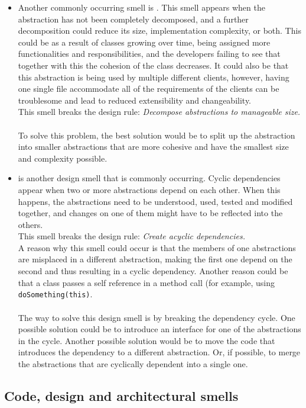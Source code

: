 \begin{itemize}
            \item Another commonly occurring smell is . This smell appears when the abstraction has not been completely decomposed, and a further decomposition could reduce its size, implementation complexity, or both. This could be as a result of classes growing over time, being assigned more functionalities and responsibilities, and the developers failing to see that together with this the cohesion of the class decreases. It could also be that this abstraction is being used by multiple different clients, however, having one single file accommodate all of the requirements of the clients can be troublesome and lead to reduced extensibility and changeability.\\
            This smell breaks the design rule: \textit{Decompose abstractions to manageable size.}\\\\
            To solve this problem, the best solution would be to split up the abstraction into smaller abstractions that are more cohesive and have the smallest size and complexity possible.
            
            \item {} is another design smell that is commonly occurring. Cyclic dependencies appear when two or more abstractions depend on each other. When this happens, the abstractions need to be understood, used, tested and modified together, and changes on one of them might have to be reflected into the others. \\ 
            This smell breaks the design rule:
            \textit{Create acyclic dependencies.} \\
            A reason why this smell could occur is that the members of one abstractions are misplaced in a different abstraction, making the first one depend on the second and thus resulting in a cyclic dependency. Another reason could be that a class passes a self reference in a method call (for example, using \texttt{doSomething(this)}. \\\\
            The way to solve this design smell is by breaking the dependency cycle. One possible solution could be to introduce an interface for one of the abstractions in the cycle. Another possible solution would be to move the code that introduces the dependency to a different abstraction. Or, if possible, to merge the abstractions that are cyclically dependent into a single one.
        \end{itemize}
    \subsection{Code, design and architectural smells}